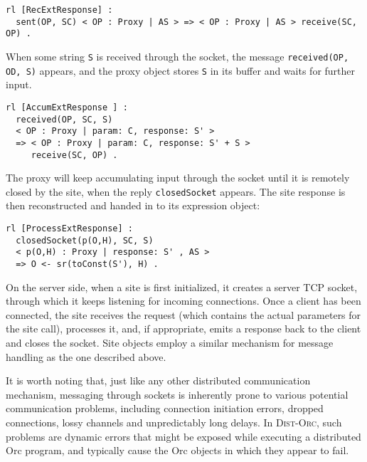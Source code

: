 \documentclass{eptcs}
\begin{document}
\begin{small}
\begin{verbatim}
rl [RecExtResponse] :
  sent(OP, SC) < OP : Proxy | AS > => < OP : Proxy | AS > receive(SC, OP) .
\end{verbatim}
\end{small}


When some string \texttt{S} is received through the socket, the message \texttt{received(OP, OD, S)} appears, and the proxy object stores \texttt{S} in its buffer and waits for further input. 

\begin{small}
\begin{verbatim}
rl [AccumExtResponse ] :
  received(OP, SC, S) 
  < OP : Proxy | param: C, response: S' >
  => < OP : Proxy | param: C, response: S' + S > 
     receive(SC, OP) .
\end{verbatim}
\end{small}

The proxy will keep accumulating input through the socket until it is remotely closed by the site, when the reply \texttt{closedSocket} appears. The site response is then reconstructed and handed in to its expression object:

\begin{small}
\begin{verbatim}
rl [ProcessExtResponse] :
  closedSocket(p(O,H), SC, S) 
  < p(O,H) : Proxy | response: S' , AS >
  => O <- sr(toConst(S'), H) .
\end{verbatim}
\end{small}


 

On the server side, when a site is first initialized, it creates a server TCP socket, through which it keeps listening for incoming connections. Once a client has been connected, the site receives the request (which contains the actual parameters for the site call), processes it, and, if appropriate, emits a response back to the client and closes the socket. Site objects employ a similar mechanism for message handling as the one described above.

It is worth noting that, just like any other distributed communication mechanism, messaging through sockets is inherently prone to various potential communication problems, including connection initiation errors, dropped connections, lossy channels and unpredictably long delays. In \textsc{Dist-Orc}, such problems are dynamic errors that might be exposed while executing a distributed Orc program, and typically cause the Orc objects in which they appear to fail.
\end{document}

